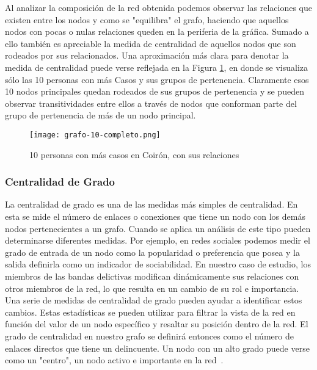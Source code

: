 \vspace{-10pt}
Al analizar la composición de la red obtenida podemos observar las relaciones que existen entre los nodos y como se "equilibra" el grafo, haciendo que aquellos nodos con pocas o nulas relaciones queden en la periferia de la gráfica. Sumado a ello también es apreciable la medida de centralidad de aquellos nodos que son rodeados por sus relacionados. Una aproximación más clara para denotar la medida de centralidad puede verse reflejada en la Figura \ref{fig:grafoTop10}, en donde se visualiza sólo las 10 personas con más Casos y sus grupos de pertenencia. Claramente esos 10 nodos principales quedan rodeados de sus grupos de pertenencia y se pueden observar transitividades entre ellos a través de nodos que conforman parte del grupo de pertenencia de más de un nodo principal.
\vspace{-10pt}
\begin{figure}
	\centering
	\texttt{[image: grafo-10-completo.png]}
	\caption{10 personas con más casos en Coirón, con sus relaciones} 
	\label{fig:grafoTop10}
\end{figure}
\vspace{-20pt}
\subsubsection{Centralidad de Grado} La centralidad de grado es una de las medidas más simples de centralidad. En esta se mide el número de enlaces o conexiones que tiene un nodo con los demás nodos pertenecientes a un grafo. Cuando se aplica un análisis de este tipo pueden determinarse diferentes medidas. Por ejemplo, en redes sociales podemos medir el grado de entrada de un nodo como la popularidad o preferencia que posea y la salida definirla como un indicador de sociabilidad. En nuestro caso de estudio, los miembros de las bandas delictivas modifican dinámicamente sus relaciones con otros miembros de la red, lo que resulta en un cambio de su rol e importancia. Una serie de medidas de centralidad de grado pueden ayudar a identificar estos cambios. Estas estadísticas se pueden utilizar para filtrar la vista de la red en función del valor de un nodo específico y resaltar su posición dentro de la red. El grado de centralidad en nuestro grafo se definirá entonces como el número de enlaces directos que tiene un delincuente. Un nodo con un alto grado puede verse como un "centro", un nodo activo e importante en la red~\cite{carley2006destabilization}.
\vspace{-10pt}
